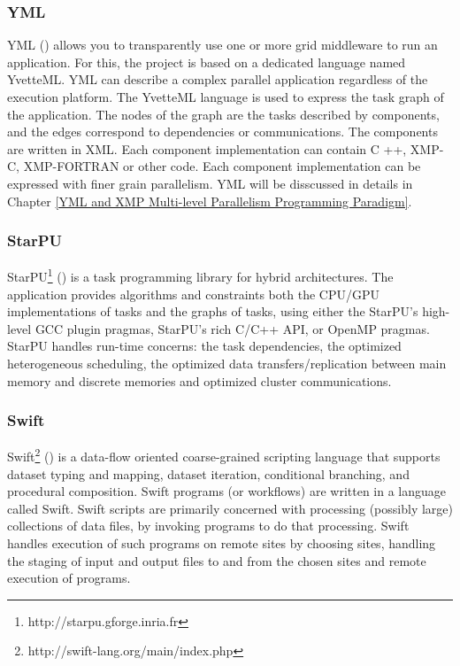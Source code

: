 \subsubsection{YML}

YML (\cite{delannoyyml}) allows you to transparently use one or more grid middleware to run an application. For this, the project is based on a dedicated language named YvetteML. YML can describe a complex parallel application regardless of the execution platform. The YvetteML language is used to express the task graph of the application. The nodes of the graph are the tasks described by components, and the edges correspond to dependencies or communications. The components are written in XML. Each component implementation can contain C ++, XMP-C, XMP-FORTRAN or other code. Each component implementation can be expressed with finer grain parallelism. YML will be disscussed in details in Chapter \ref{YML and XMP Multi-level Parallelism Programming Paradigm}.

\subsubsection{StarPU}

StarPU\footnote{http://starpu.gforge.inria.fr} (\cite{augonnet2011starpu}) is a task programming library for hybrid architectures. The application provides algorithms and constraints both the CPU/GPU implementations of tasks and the graphs of tasks, using either the StarPU's high-level GCC plugin pragmas, StarPU's rich C/C++ API, or OpenMP pragmas. StarPU handles run-time concerns: the task dependencies, the optimized heterogeneous scheduling, the optimized data transfers/replication between main memory and discrete memories and optimized cluster communications.

\subsubsection{Swift}

Swift\footnote{http://swift-lang.org/main/index.php} (\cite{wilde2011swift}) is a data-flow oriented coarse-grained scripting language that supports dataset typing and mapping, dataset iteration, conditional branching, and procedural composition. Swift programs (or workflows) are written in a language called Swift. Swift scripts are primarily concerned with processing (possibly large) collections of data files, by invoking programs to do that processing. Swift handles execution of such programs on remote sites by choosing sites, handling the staging of input and output files to and from the chosen sites and remote execution of programs.

